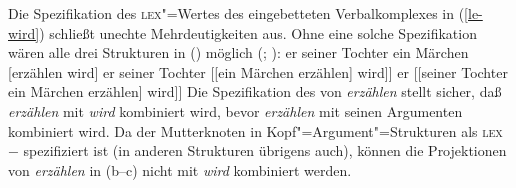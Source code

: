 Die Spezifikation des \textsc{lex}"=Wertes des eingebetteten Verbalkomplexes in (\ref{le-wird})
schließt unechte Mehrdeutigkeiten aus.
Ohne eine solche Spezifikation wären alle drei Strukturen in () möglich (\citealp[]{Pollard90a};
\citealp{HN94b}):
\eal
\ex er seiner Tochter  ein Märchen [erzählen wird]
\ex er seiner Tochter [[ein Märchen erzählen] wird]]\label{pvp-ein-maerchen-erzaehlen}
\ex er [[seiner Tochter ein Märchen erzählen] wird]]
\zl
Die Spezifikation des \lexwes von \emph{erzählen} stellt sicher, daß \emph{erzählen} mit \emph{wird} kombiniert wird,
bevor \emph{erzählen} mit seinen Argumenten kombiniert wird. Da der Mutterknoten in
Kopf"=Argument"=Strukturen als \textsc{lex}$-$ spezifiziert ist (in anderen Strukturen übrigens auch), 
können die Projektionen
von \emph{erzählen} in (b--c) nicht mit \emph{wird} kombiniert werden.

